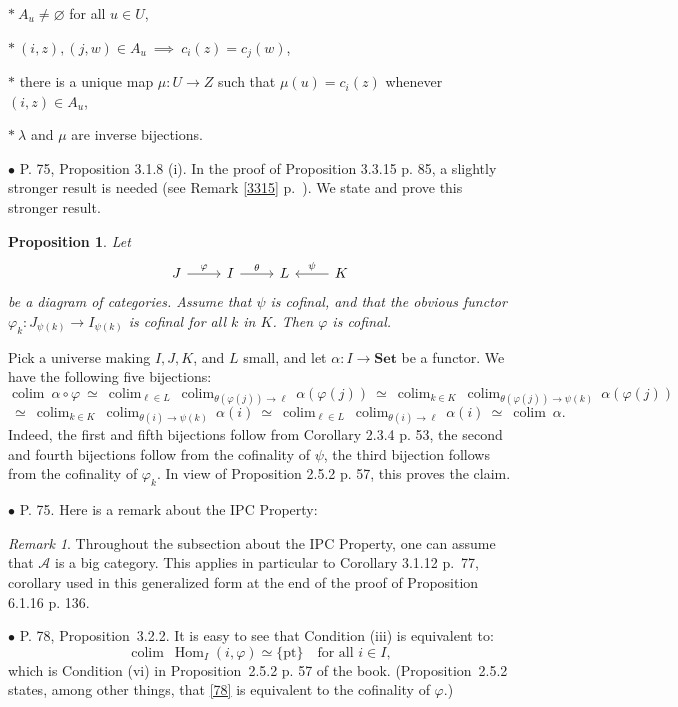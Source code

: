 \documentclass[12pt]{article}
\newtheorem{prop}[thm]{Proposition}
\theoremstyle{remark}%
\newtheorem{rk}[thm]{Remark}%
\newcommand{\bu}{\bullet}
\newcommand{\n}{\noindent}
\newcommand{\A}{\mathcal A}
\newcommand{\Set}{\textbf{Set}}
\newcommand{\p}{\varphi}
\newcommand{\pt}{\{\text{pt}\}}
\newcommand{\pr}{Proposition}
\DeclareMathOperator*{\coli}{colim}
\DeclareMathOperator*{\co}{colim}
\DeclareMathOperator{\h}{Hom}
\begin{document}
\n$*\ A_u\ne\varnothing$ for all $u\in U$,

\n$*\ (i,z),(j,w)\in A_u\ \implies\ c_i(z)=c_j(w)$, 

\n$*$ there is a unique map $\mu:U\to Z$ such that $\mu(u)=c_i(z)$ whenever $(i,z)\in A_u$,

\n$*\ \lambda$ and $\mu$ are inverse bijections. 


\n$\bu$ P. 75, Proposition 3.1.8 (i). In the proof of Proposition 3.3.15 p. 85, a slightly stronger result is needed (see Remark \ref{3315} p.~\pageref{3315}). We state and prove this stronger result. 
%
\begin{prop}\label{318i} 
% 
Let 
$$
\begin{tikzcd}
J\ar{r}{\p}&I\ar{r}{\theta}&L&K\ar{l}[swap]{\psi}
\end{tikzcd}
$$
be a diagram of categories. Assume that $\psi$ is cofinal, and that the obvious functor $\p_k:J_{\psi(k)}\to I_{\psi(k)}$ is cofinal for all $k$ in $K$. Then $\p$ is cofinal. 
% 
\end{prop} 
% 
\n{\em Proof.} Pick a universe making $I,J,K$, and $L$ small, and let $\alpha:I\to\Set$ be a functor. We have the following five bijections:
$$
\coli\ \alpha\circ\p\ \simeq\ 
%
\coli_{\ell\in L}\ \coli_{\theta(\p(j))\to\ell}\ \alpha(\p(j))\ \simeq\ 
%
\coli_{k\in K}\ \coli_{\theta(\p(j))\to\psi(k)}\ \alpha(\p(j))
$$
$$
\ \simeq\ \coli_{k\in K}\ \coli_{\theta(i)\to\psi(k)}\ \alpha(i)\ \simeq\ 
%
\coli_{\ell\in L}\ \coli_{\theta(i)\to\ell}\ \alpha(i)\ \simeq\ 
%
\coli\ \alpha.
$$
Indeed, the first and fifth bijections follow from Corollary 2.3.4 p. 53, the second and fourth bijections follow from the cofinality of $\psi$, the third bijection follows from the cofinality of $\p_k$. In view of Proposition 2.5.2 p. 57, this proves the claim. 


\n$\bu$ P. 75. Here is a remark about the IPC Property: 
% 
\begin{rk}\label{ipc} 
Throughout the subsection about the IPC Property, one can assume that $\A$ is a big category. This applies in particular to Corollary 3.1.12 p.~77, corollary used in this generalized form at the end of the proof of Proposition 6.1.16 p. 136. 
\end{rk} 


\n$\bu$ P. 78, \pr\ 3.2.2. It is easy to see that Condition (iii) is equivalent to: 
%
\begin{equation}\label{78} 
\co\ \h_I(i,\p)\simeq\pt\quad\text{for all }i\in I, 
\end{equation} 
% 
which is Condition (vi) in \pr\ 2.5.2 p. 57 of the book. (\pr\ 2.5.2 states, among other things, that \eqref{78} is equivalent to the cofinality of $\p$.) 
\end{document}
